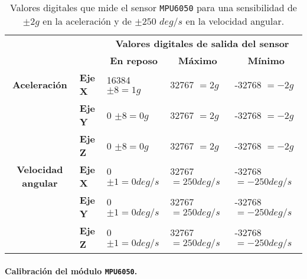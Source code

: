 \begin{table}[!h]
\centering
\begin{tabular}{cl|l|l|l|}
\cline{3-5}
\multicolumn{1}{l}{}                                     &       & \multicolumn{3}{c|}{\textbf{Valores digitales de salida del sensor}}                                \\ \cline{3-5} 
\multicolumn{1}{l}{}                                     &       & \multicolumn{1}{c|}{\textbf{En reposo}} & \multicolumn{1}{c|}{\textbf{Máximo}} & \multicolumn{1}{c|}{\textbf{Mínimo}} \\ \hline
\multicolumn{1}{|c|}{\multirow{}{}{\textbf{Aceleración}}}       & \textbf{Eje X} & 16384 $\pm 8 = 1g$             & 32767 $= 2g$                & -32768 $= -2g$              \\ \cline{2-5} 
\multicolumn{1}{|c|}{}                                   & \textbf{Eje Y }& 0 $\pm 8 = 0g$                 & 32767 $= 2g$                & -32768 $= -2g$              \\ \cline{2-5} 
\multicolumn{1}{|c|}{}                                   & \textbf{Eje Z }& 0 $\pm 8 = 0g$                 & 32767 $= 2g$                & -32768 $= -2g$              \\ \hline
\multicolumn{1}{|c|}{\multirow{}{}{\textbf{Velocidad angular}}} & \textbf{Eje X} & 0 $\pm 1 = 0deg/s$             & 32767 $= 250deg/s$          & -32768 $= -250deg/s$        \\ \cline{2-5} 
\multicolumn{1}{|c|}{}                                   & \textbf{Eje Y} & 0 $\pm 1 = 0deg/s$             & 32767 $= 250deg/s$          & -32768 $= -250deg/s$        \\ \cline{2-5} 
\multicolumn{1}{|c|}{}                                   & \textbf{Eje Z} & 0 $\pm 1 = 0deg/s$             & 32767 $= 250deg/s$          & -32768 $= -250deg/s$        \\ \hline
\end{tabular}
\caption{Valores digitales que mide el sensor \texttt{MPU6050} para una sensibilidad de $\pm 2g$ en la aceleración y de $\pm 250$ $deg/s$ en la velocidad angular.}
\label{table:reposo_mpu6050}
\end{table}

\paragraph{Calibración del módulo \texttt{MPU6050}.}


